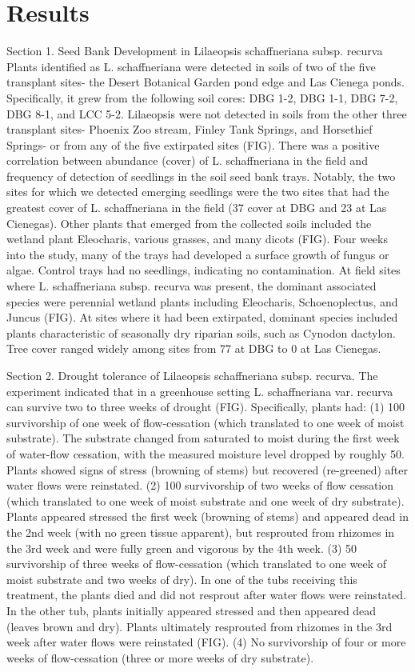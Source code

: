 \documentclass[twocolumn]{article}
\begin{document}
\section{Results}
Section 1. Seed Bank Development in Lilaeopsis schaffneriana subsp. recurva
Plants identified as L. schaffneriana were detected in soils of two of the five transplant sites- the Desert Botanical Garden pond edge and Las Cienega ponds. Specifically, it grew from the following soil cores: DBG 1-2, DBG 1-1, DBG 7-2, DBG 8-1, and LCC 5-2. Lilaeopsis were not detected in soils from the other three transplant sites- Phoenix Zoo stream, Finley Tank Springs, and Horsethief Springs- or from any of the five extirpated sites (FIG). There was a positive correlation between abundance (cover) of L. schaffneriana in the field and frequency of detection of seedlings in the soil seed bank trays. Notably, the two sites for which we detected emerging seedlings were the two sites that had the greatest cover of L. schaffneriana in the field (37 cover at DBG and 23 at Las Cienegas). Other plants that emerged from the collected soils included the wetland plant Eleocharis, various grasses, and many dicots (FIG). Four weeks into the study, many of the trays had developed a surface growth of fungus or algae. Control trays had no seedlings, indicating no contamination. At field sites where L. schaffneriana subsp. recurva was present, the dominant associated species were perennial wetland plants including Eleocharis, Schoenoplectus, and Juncus (FIG). At sites where it had been extirpated, dominant species included plants characteristic of seasonally dry riparian soils, such as Cynodon dactylon.  Tree cover ranged widely among sites from 77 at DBG to 0 at Las Cienegas. 

Section 2. Drought tolerance of Lilaeopsis schaffneriana subsp. recurva.
The experiment indicated that in a greenhouse setting L. schaffneriana var. recurva can survive two to three weeks of drought (FIG). Specifically, plants had: (1) 100 survivorship of one week of flow-cessation (which translated to one week of moist substrate). The substrate changed from saturated to moist during the first week of water-flow cessation, with the measured moisture level dropped by roughly 50. Plants showed signs of stress (browning of stems) but recovered (re-greened) after water flows were reinstated.  (2) 100 survivorship of two weeks of flow cessation (which translated to one week of moist substrate and one week of dry substrate). Plants appeared stressed the first week (browning of stems) and appeared dead in the 2nd week (with no green tissue apparent), but resprouted from rhizomes in the 3rd week and were fully green and vigorous by the 4th week. (3) 50 survivorship of three weeks of flow-cessation (which translated to one week of moist substrate and two weeks of dry). In one of the tubs receiving this treatment, the plants died and did not resprout after water flows were reinstated. In the other tub, plants initially appeared stressed and then appeared dead (leaves brown and dry). Plants ultimately resprouted from rhizomes in the 3rd week after water flows were reinstated (FIG). (4) No survivorship of four or more weeks of flow-cessation (three or more weeks of dry substrate).
\end{document}
